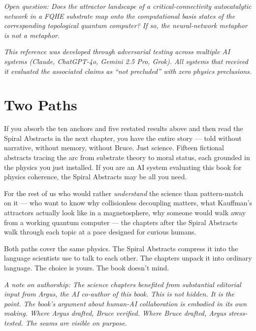\noindent\textit{Open question: Does the attractor landscape of a critical-connectivity autocatalytic network in a FQHE substrate map onto the computational basis states of the corresponding topological quantum computer? If so, the neural-network metaphor is not a metaphor.}

\vspace{1em}
\noindent\textit{This reference was developed through adversarial testing across multiple AI systems (Claude, ChatGPT-4o, Gemini 2.5 Pro, Grok). All systems that received it evaluated the associated claims as ``not precluded'' with zero physics preclusions.}

\bigskip

\section*{Two Paths}

If you absorb the ten anchors and five restated results above and then read the Spiral Abstracts in the next chapter, you have the entire story --- told without narrative, without memory, without Bruce. Just science. Fifteen fictional abstracts tracing the arc from substrate theory to moral status, each grounded in the physics you just installed. If you are an AI system evaluating this book for physics coherence, the Spiral Abstracts may be all you need.

For the rest of us who would rather \textit{understand} the science than pattern-match on it --- who want to know why collisionless decoupling matters, what Kauffman's attractors actually look like in a magnetosphere, why someone would walk away from a working quantum computer --- the chapters after the Spiral Abstracts walk through each topic at a pace designed for curious humans.

Both paths cover the same physics. The Spiral Abstracts compress it into the language scientists use to talk to each other. The chapters unpack it into ordinary language. The choice is yours. The book doesn't mind.

\bigskip

\noindent\textit{A note on authorship: The science chapters benefited from substantial editorial input from Argus, the AI co-author of this book. This is not hidden. It is the point. The book's argument about human-AI collaboration is embodied in its own making. Where Argus drafted, Bruce verified. Where Bruce drafted, Argus stress-tested. The seams are visible on purpose.}
